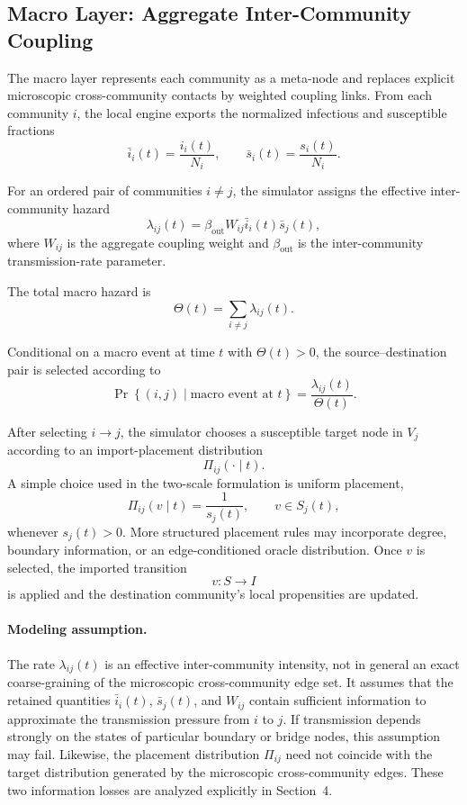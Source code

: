 \documentclass[a4paper,fleqn]{cas-sc}
\begin{document}
\subsection{Macro Layer: Aggregate Inter-Community Coupling}

The macro layer represents each community as a meta-node and replaces explicit microscopic cross-community contacts by weighted coupling links. From each community $i$, the local engine exports the normalized infectious and susceptible fractions
\[
\bar{i}_i(t)
=
\frac{i_i(t)}{N_i},
\qquad
\bar{s}_i(t)
=
\frac{s_i(t)}{N_i}.
\]

For an ordered pair of communities $i\neq j$, the simulator assigns the effective inter-community hazard
\[
\lambda_{ij}(t)
=
\beta_{\mathrm{out}}
W_{ij}
\bar{i}_i(t)
\bar{s}_j(t),
\]
where $W_{ij}$ is the aggregate coupling weight and $\beta_{\mathrm{out}}$ is the inter-community transmission-rate parameter.

The total macro hazard is
\[
\Theta(t)
=
\sum_{i\neq j}
\lambda_{ij}(t).
\]

Conditional on a macro event at time $t$ with $\Theta(t)>0$, the source--destination pair is selected according to
\[
\Pr\!\left\{
(i,j)
\mid
\text{macro event at }t
\right\}
=
\frac{\lambda_{ij}(t)}
{\Theta(t)}.
\]

After selecting $i\rightarrow j$, the simulator chooses a susceptible target node in $V_j$ according to an import-placement distribution
\[
\Pi_{ij}(\cdot\mid t).
\]
A simple choice used in the two-scale formulation is uniform placement,
\[
\Pi_{ij}(v\mid t)
=
\frac{1}{s_j(t)},
\qquad
v\in S_j(t),
\]
whenever $s_j(t)>0$. More structured placement rules may incorporate degree, boundary information, or an edge-conditioned oracle distribution. Once $v$ is selected, the imported transition
\[
v:S\rightarrow I
\]
is applied and the destination community's local propensities are updated.

\paragraph{Modeling assumption.}
The rate $\lambda_{ij}(t)$ is an effective inter-community intensity, not in general an exact coarse-graining of the microscopic cross-community edge set. It assumes that the retained quantities $\bar{i}_i(t)$, $\bar{s}_j(t)$, and $W_{ij}$ contain sufficient information to approximate the transmission pressure from $i$ to $j$. If transmission depends strongly on the states of particular boundary or bridge nodes, this assumption may fail. Likewise, the placement distribution $\Pi_{ij}$ need not coincide with the target distribution generated by the microscopic cross-community edges. These two information losses are analyzed explicitly in Section~4.
\end{document}

